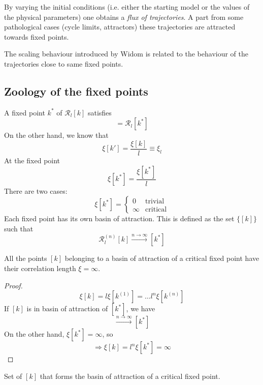 \documentclass[../main/main.tex]{subfiles}
\begin{document}
By varying the initial conditions (i.e. either the starting model or the values of the physical parameters) one obtains a \emph{flux of trajectories}.
A part from some pathological cases (cycle limits, attractors) these trajectories are attracted towards fixed points.

The scaling behaviour introduced by Widom is related to the behaviour of the trajectories close to same fixed points.

 \subsection{Zoology of the fixed points}
 A fixed point \( k^* \) of \( \mathcal{R}_l [k] \) satisfies
 \begin{equation}
   [k^*] = \mathcal{R}_l [k^*]
 \end{equation}
On the other hand, we know that
\begin{equation}
  \xi [k'] = \frac{\xi [k]}{l} \equiv \xi _l
 \end{equation}
At the fixed point
\begin{equation}
  \xi [k^*] = \frac{\xi [k^*]}{l}
\end{equation}
There are two cases:
\begin{equation}
  \xi [k^*] =
  \begin{cases}
   0 & \text{trivial}\\
   \infty & \text{critical}
  \end{cases}
\end{equation}
Each fixed point has its own basin of attraction. This is defined as the set \( \{ [k] \}   \) such that
\begin{equation}
  \mathcal{R}_l^{(n)} [k] \overset{n \rightarrow \infty }{\longrightarrow} [k^*]
\end{equation}
\begin{theorem}[]
All the points \([k]  \) belonging to a basin of attraction of a critical fixed point have their correlation length \( \xi = \infty  \).
\end{theorem}
\begin{proof}
\begin{equation}
  \xi [k] = l \xi [k^{(1)}] = \dots l^n \xi [ k^{(n)}]
\end{equation}
If \( [k] \) is in basin of attraction of \( [k^*] \), we have
\begin{equation}
  [k^{(n)}] \overset{n \rightarrow \infty }{\longrightarrow} [k^*]
\end{equation}
On the other hand, \( \xi [k^*] = \infty  \), so
\begin{equation}
  \Rightarrow \xi [k] = l^n \xi [k^*] = \infty
\end{equation}
\end{proof}
\begin{definition}
  Set of \( [k] \) that forms the basin of attraction of a critical fixed point.
\end{definition}
\end{document}
